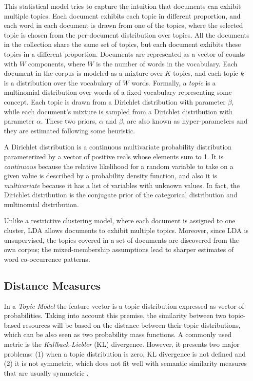 This statistical model tries to capture the intuition that documents can exhibit multiple topics. Each document exhibits each topic in different proportion, and each word in each document is drawn from one of the topics, where the selected topic is chosen from the per-document distribution over topics. All the documents in the collection share the same set of topics, but each document exhibits these topics in a different proportion. Documents are represented as a vector of counts with $W$ components, where $W$ is the number of words in the vocabulary. Each document in the corpus is modeled as a mixture over $K$ topics, and each topic $k$ is a distribution over the vocabulary of $W$ words. Formally, a \textit{topic} is a multinomial distribution over words of a fixed vocabulary representing some concept. Each topic is drawn from a Dirichlet distribution with parameter $\beta$, while each document's mixture is sampled from a Dirichlet distribution with parameter $\alpha$. These two priors, $\alpha$ and $\beta$, are also known as hyper-parameters and they are estimated following some heuristic.

A Dirichlet distribution is a continuous multivariate probability distribution parameterized by a vector of positive reals whose elements sum to 1.  It is \textit{continuous} because the relative likelihood for a random variable to take on a given value is described by a probability density function, and also it is \textit{multivariate} because it has a list of variables with unknown values. In fact, the Dirichlet distribution is the conjugate prior of the categorical distribution and multinomial distribution.

Unlike a restrictive clustering model, where each document is assigned to one cluster, LDA allows documents to exhibit multiple topics. Moreover, since LDA is unsupervised, the topics covered in a set of documents are discovered from the own corpus; the mixed-membership assumptions lead to sharper estimates of word co-occurrence patterns.

\subsection{Distance Measures}
In a \textit{Topic Model} the feature vector is a topic distribution expressed as vector of probabilities. Taking into account this premise, the similarity between two topic-based resources will be based on the distance between their topic distributions, which can be also seen as two probability mass functions. A commonly used metric is the \textit{Kullback-Liebler} (KL) divergence. However, it presents two major problems: (1) when a topic distribution is zero, KL divergence is not defined and (2) it is not symmetric, which does not fit well with semantic similarity measures that are usually symmetric \cite{Rus2013}.

